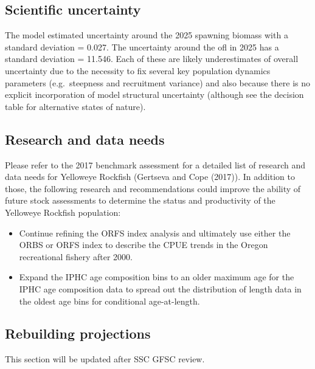 \documentclass[
]{scrartcl}
\providecommand{\tightlist}{%
  \setlength{\itemsep}{0pt}\setlength{\parskip}{0pt}}\usepackage{longtable,booktabs,array}
\begin{document}
\subsection*{Scientific uncertainty}\label{scientific-uncertainty}

The model estimated uncertainty around the 2025 spawning biomass with a
standard deviation = 0.027. The uncertainty around the \gls{ofl} in 2025
has a standard deviation = 11.546. Each of these are likely
underestimates of overall uncertainty due to the necessity to fix
several key population dynamics parameters (e.g.~steepness and
recruitment variance) and also because there is no explicit
incorporation of model structural uncertainty (although see the decision
table for alternative states of nature).

\subsection*{Research and data needs}\label{research-and-data-needs}

Please refer to the 2017 benchmark assessment for a detailed list of
research and data needs for Yelloweye Rockfish (Gertseva and Cope
(2017)). In addition to those, the following research and
recommendations could improve the ability of future stock assessments to
determine the status and productivity of the Yelloweye Rockfish
population:

\begin{itemize}
\tightlist
\item
  Continue refining the ORFS index analysis and ultimately use either
  the ORBS or ORFS index to describe the CPUE trends in the Oregon
  recreational fishery after 2000.
\item
  Expand the IPHC age composition bins to an older maximum age for the
  IPHC age composition data to spread out the distribution of length
  data in the oldest age bins for conditional age-at-length.
\end{itemize}

\subsection*{Rebuilding projections}\label{rebuilding-projections}

This section will be updated after SSC GFSC review.
\end{document}
